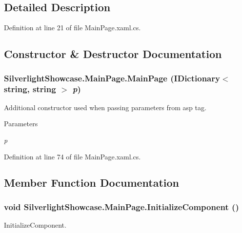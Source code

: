 \subsection{Detailed Description}


Definition at line 21 of file MainPage.xaml.cs.

\subsection{Constructor \& Destructor Documentation}
\hypertarget{class_silverlight_showcase_1_1_main_page_ac85c02c58943a5ae1721a68ee44c7855}{
\subsubsection[{MainPage}]{\setlength{\rightskip}{0pt plus 5cm}SilverlightShowcase.MainPage.MainPage (IDictionary$<$ string, string $>$ {\em p})}}
\label{class_silverlight_showcase_1_1_main_page_ac85c02c58943a5ae1721a68ee44c7855}


Additional constructor used when passing parameters from asp tag. 
\begin{DoxyParams}{Parameters}
\item[{\em p}]\end{DoxyParams}


Definition at line 74 of file MainPage.xaml.cs.

\subsection{Member Function Documentation}
\hypertarget{class_silverlight_showcase_1_1_main_page_a92670f2bc7dcc80b9e95d52cdcdae7df}{
\subsubsection[{InitializeComponent}]{\setlength{\rightskip}{0pt plus 5cm}void SilverlightShowcase.MainPage.InitializeComponent ()}}
\label{class_silverlight_showcase_1_1_main_page_a92670f2bc7dcc80b9e95d52cdcdae7df}


InitializeComponent. 

